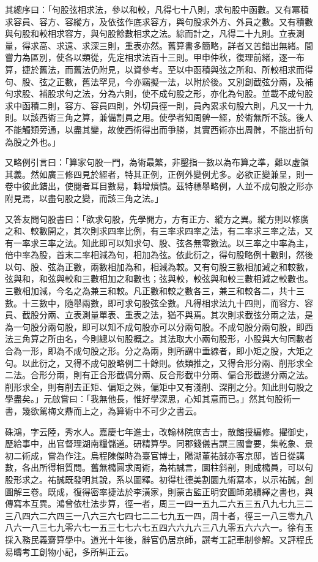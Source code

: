 \begin{pinyinscope}
其總序曰：「句股弦相求法，參以和較，凡得七十八則，求句股中函數。又有冪積求容員、容方、容縱方，及依弦作底求容方，與句股求外方、外員之數。又有積數與句股和較相求容方，與句股餘數相求之法。綜而計之，凡得二十九則。立表測量，得求高、求遠、求深三則，重表亦然。舊算書多簡略，詳者又苦錯出無緒。間嘗力為區別，使各以類從，先定相求法百十三則。甲申仲秋，復理前緒，逐一布算，捷於舊法，而舊法仍附見，以資參考。至以中函積與弦之所和、所較相求而得句、股、弦之正數，舊法罕見，今亦竊擬一法，以附於後。又別創截弦分兩，及補句求股、補股求句之法，分為六則，使不成句股之形，亦化為句股。並載不成句股求中函積二則，容方、容員四則，外切員徑一則，員內累求句股六則，凡又一十九則。以該西術三角之算，兼備割員之用。使學者知周髀一經，於術無所不該。後人不能觸類旁通，以盡其變，故使西術得出而爭勝，其實西術亦出周髀，不能出折句為股之外也。」

又略例引言曰：「算家句股一門，為術最繁，非鑿指一數以為布算之準，難以虛領其義。然如廣三修四見於經者，特其正例，正例外變例尤多。必欲正變兼呈，則一卷中彼此錯出，使閱者耳目數易，轉增煩憒。茲特標舉略例，人並不成句股之形亦附見焉，以盡句股之變，而該三角之法。」

又答友問句股書曰：「欲求句股，先學開方，方有正方、縱方之異。縱方則以修廣之和、較數開之，其次則求四率比例，有三率求四率之法，有二率求三率之法，又有一率求三率之法。知此即可以知求句、股、弦各無零數法。以三率之中率為主，倍中率為股，首末二率相減為句，相加為弦。依此衍之，得句股略例十數則，然後以句、股、弦為正數，兩數相加為和，相減為較。又有句股三數相加減之和較數，弦與和，和弦與較和三數相加之和數也；弦與較，較弦與和較三數相減之較數也。三數相加減，今名之為兼三和較。凡正數和較之數各三，兼三和較各二，共十三數。十三數中，隨舉兩數，即可求句股弦全數。凡得相求法九十四則，而容方、容員、截股分兩、立表測量單表、重表之法，猶不與焉。其次則求截弦分兩之法，是為一句股分兩句股，即可以知不成句股亦可以分兩句股。不成句股分兩句股，即西法三角算之所由名，今則總以句股概之。其法取大小兩句股形，小股與大句同數者合為一形，即為不成句股之形。分之為兩，則所謂中垂線者，即小矩之股，大矩之句。以此衍之，又得不成句股略例二十餘則。依類推之，又得合形分兩、削形求全二法。合形分兩，則有正合形截偶分兩、反合形截中分兩、偏合形截邊分兩之法。削形求全，則有削去正矩、偏矩之殊，偏矩中又有淺削、深削之分。知此則句股之學盡矣。」元啟嘗曰：「我無他長，惟好學深思，心知其意而已。」然其句股術一書，幾欲駕梅文鼎而上之，為算術中不可少之書云。

硃鴻，字云陸，秀水人。嘉慶七年進士，改翰林院庶吉士，散館授編修。擢御史，歷給事中，出官督理湖南糧儲道。研精算學。同郡錢儀吉譔三國會要，集乾象、景初二術成，嘗為作注。烏程陳傑時為臺官博士，陽湖董祐誠亦客京邸，皆日從講數，各出所得相質問。舊無橢圓求周術，為祐誠言，圜柱斜剖，則成橢員，可以句股形求之。祐誠既發明其說，系以圖釋。初得杜德美割圜九術寫本，以示祐誠，創圖解三卷。既成，復得密率捷法於李潢家，則蒙古監正明安圖師弟續繹之書也，與傳寫本互異。鴻曾依杜法步算，徑一者，周三一四一五九二六五三五八九七九三二三八四六二六四三一八六三六七四七二二七九五一四，周十者，徑三一八三零九八八六一八三七九零六七一五三七七六七五四六六九六三八九零五六六六一。徐有玉採入務民義齋算學中。道光十年後，辭官仍居京師，譔考工記車制參解。又評程氏易疇考工創物小記，多所糾正云。


\end{pinyinscope}

